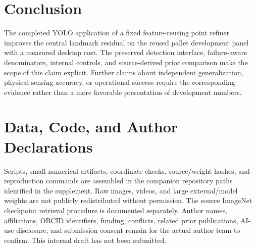 \documentclass[journal]{IEEEtran}
\begin{document}
\section{Conclusion}
The completed YOLO application of a fixed feature-reusing point refiner improves the central landmark residual on the reused pallet development panel with a measured desktop cost. The preserved detection interface, failure-aware denominators, internal controls, and source-derived prior comparison make the scope of this claim explicit. \ConclusionPrior{} \ConfirmationConclusion{} \DopeConclusionStatus{} \ResnetConclusionStatus{} Further claims about independent generalization, physical sensing accuracy, or operational success require the corresponding evidence rather than a more favorable presentation of development numbers.

\section*{Data, Code, and Author Declarations}
Scripts, small numerical artifacts, coordinate checks, source/weight hashes, and reproduction commands are assembled in the companion repository paths identified in the supplement. Raw images, videos, and large external/model weights are not publicly redistributed without permission. The source ImageNet checkpoint retrieval procedure is documented separately. Author names, affiliations, ORCID identifiers, funding, conflicts, related prior publications, AI-use disclosure, and submission consent remain for the actual author team to confirm. This internal draft has not been submitted.


\end{document}
